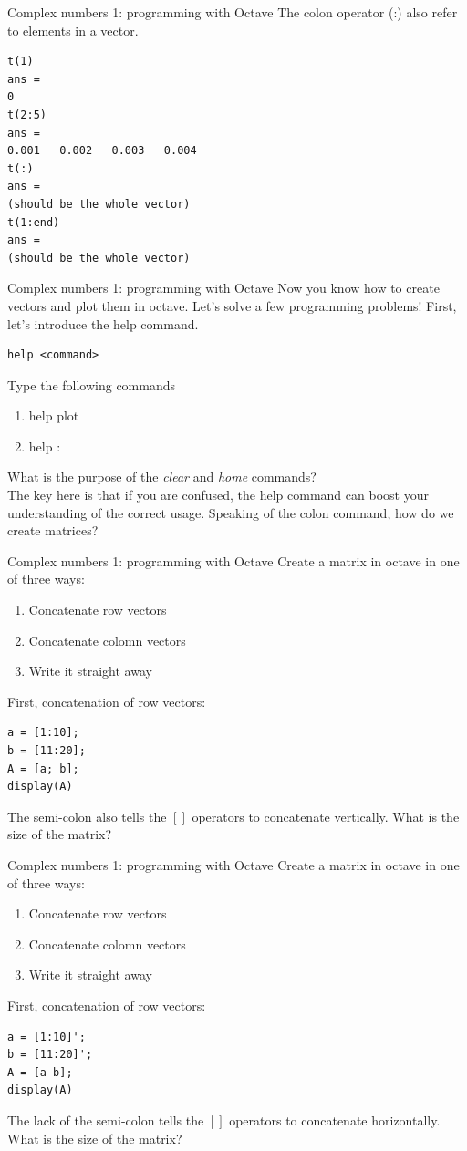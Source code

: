 \documentclass{beamer}
\begin{document}
\begin{frame}[fragile]{Complex numbers 1: programming with Octave}
The colon operator (:) also refer to elements in a vector.
\begin{verbatim}
t(1)
ans =
0
t(2:5)
ans = 
0.001   0.002   0.003   0.004
t(:)
ans = 
(should be the whole vector)
t(1:end)
ans =
(should be the whole vector)
\end{verbatim}
\end{frame}

\begin{frame}[fragile]{Complex numbers 1: programming with Octave}
Now you know how to create vectors and plot them in octave.  Let's solve a few programming problems!  First, let's introduce the \alert{help} command.
\begin{verbatim}
help <command>
\end{verbatim}
Type the following commands
\begin{enumerate}
\item help plot
\item help :
\end{enumerate}
What is the purpose of the \textit{clear} and \textit{home} commands? \\ \vspace{0.5cm}
The key here is that if you are confused, the help command can boost your understanding of the correct usage.  Speaking of the colon command, how do we create matrices?
\end{frame}

\begin{frame}[fragile]{Complex numbers 1: programming with Octave}
\small
Create a matrix in octave in one of three ways:
\begin{enumerate}
\item \alert{Concatenate row vectors}
\item Concatenate colomn vectors
\item Write it straight away
\end{enumerate}
First, concatenation of row vectors:
\begin{verbatim}
a = [1:10];
b = [11:20];
A = [a; b];
display(A)
\end{verbatim}
The semi-colon also tells the $[]$ operators to concatenate vertically.  What is the size of the matrix?
\end{frame}

\begin{frame}[fragile]{Complex numbers 1: programming with Octave}
\small
Create a matrix in octave in one of three ways:
\begin{enumerate}
\item Concatenate row vectors
\item \alert{Concatenate colomn vectors}
\item Write it straight away
\end{enumerate}
First, concatenation of row vectors:
\begin{verbatim}
a = [1:10]';
b = [11:20]';
A = [a b];
display(A)
\end{verbatim}
The lack of the semi-colon tells the $[]$ operators to concatenate horizontally.  What is the size of the matrix?
\end{frame}
\end{document}
